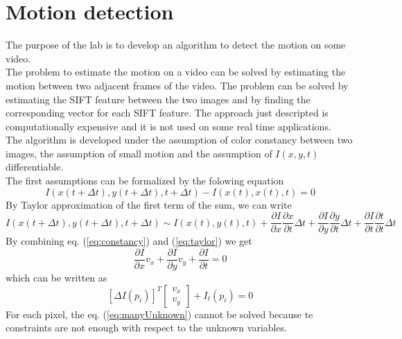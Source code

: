 \documentclass[11pt]{article}
\begin{document}
\section{Motion detection}
The purpose of the lab is to develop an algorithm to detect the motion on some video.\\
The problem to estimate the motion on a video can be solved by estimating the motion between two adjacent frames of the video. The problem can be solved by estimating the SIFT feature between the two images and by finding the corresponding vector for each SIFT feature. The approach just descripted is computationally expensive and it is not used on some real time applications.\\
The algorithm is developed under the assumption of color constancy between two images, the assumption of small motion and the assumption of $I(x,y,t)$ differentiable.\\
The first assumptions can be formalized by the folowing equation
\begin{equation}
\label{eq:constancy}
I\left(x\left(t+\Delta t\right),y\left(t+\Delta t\right),t+\Delta t\right)
-I\left(x\left(t\right),x\left(t\right),t\right)=0
\end{equation}
By Taylor approximation of the first term of the sum, we can write
\begin{equation}
\label{eq:taylor}
I\left(x\left(t+\Delta t\right),y\left(t+\Delta t\right),t+\Delta t\right)\sim
I\left(x\left(t\right),y\left(t\right),t\right)
+\frac{\partial I}{\partial x} \frac{\partial x}{\partial t} \Delta t
+\frac{\partial I}{\partial y} \frac{\partial y}{\partial t} \Delta t
+\frac{\partial I}{\partial t} \frac{\partial t}{\partial t} \Delta t
\end{equation}
By combining eq. (\ref{eq:constancy}) and (\ref{eq:taylor}) we get
\begin{equation}
\label{eq:eq0}
\frac{\partial I}{\partial x } v_x + \frac{\partial I}{\partial y} v_y+ \frac{\partial I}{\partial t} = 0
\end{equation}
which can be written as
\begin{equation}
\label{eq:manyUnknown}
\left[ \Delta I (p_i)\right]^T
\begin{bmatrix}
v_x\\
v_y
\end{bmatrix} + I_t (p_i) = 0
\end{equation}
For each pixel, the eq. (\ref{eq:manyUnknown}) cannot be solved because te constraints are not enough with respect to the unknown variables.\\
\end{document}
